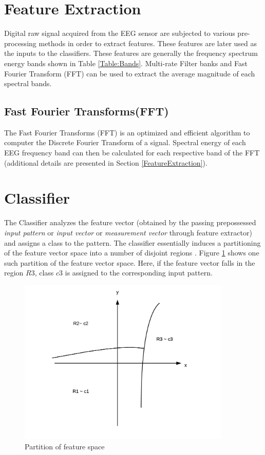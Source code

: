     
\section{Feature Extraction}
\label{Pre-processing Methods}
	Digital raw signal acquired from the EEG sensor are subjected to various pre-processing methods in order to extract features. These features are later used as the inputs to the classifiers. These features are generally the frequency spectrum energy bands shown in Table \ref{Table:Bands}. Multi-rate Filter banks and Fast Fourier Transform (FFT) can be used to extract the average magnitude of each spectral bands.
        
    \subsection{Fast Fourier Transforms(FFT)} 
    	The Fast Fourier Transforms (FFT) is an optimized and efficient algorithm to computer the Discrete Fourier Transform of a signal. Spectral energy of each EEG frequency band can then be calculated for each respective band of the FFT (additional details are presented in Section \ref{FeatureExtraction}).
   
\section{Classifier}
	The Classifier analyzes the feature vector (obtained by the passing prepossessed \textit{input pattern} or \textit{input vector} or \textit{measurement vector} through feature extractor) and assigns a class to the pattern. The classifier essentially induces a partitioning of the feature vector space into a number of disjoint regions \cite{Therrien:1989:DEC:61950}. Figure \ref{fig:regions} shows one such partition of the feature vector space. Here, if the feature vector falls in the region $R3$, class $c3$ is assigned to the corresponding input pattern.
    
		\begin{figure}[hbtp]
            \centering
            \includegraphics[width=0.9\textwidth]{Chapter-2/regions}
            \caption{Partition of feature space \cite{Therrien:1989:DEC:61950} }
            \label{fig:regions}
        \end{figure}
        

